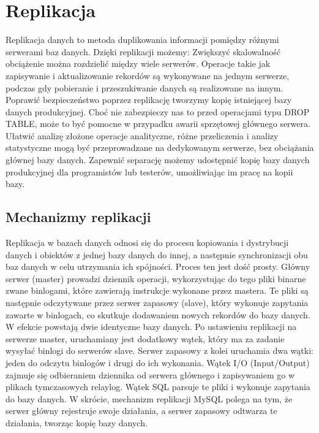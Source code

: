 \documentclass[letterpaper,10pt,polish]{sphinxmanual}
\begin{document}
\sphinxstepscope


\chapter{Replikacja}
\label{\detokenize{rozdzialy/rozdzial5:replikacja}}\label{\detokenize{rozdzialy/rozdzial5::doc}}
\sphinxAtStartPar
Replikacja danych to metoda duplikowania informacji pomiędzy różnymi serwerami baz danych.
Dzięki replikacji możemy:
\sphinxhyphen{} Zwiększyć skalowalność \textendash{} obciążenie można rozdzielić między wiele serwerów. Operacje takie jak zapisywanie i aktualizowanie rekordów są wykonywane na jednym serwerze, podczas gdy pobieranie i przeszukiwanie danych są realizowane na innym.
\sphinxhyphen{} Poprawić bezpieczeństwo \textendash{} poprzez replikację tworzymy kopię istniejącej bazy danych produkcyjnej. Choć nie zabezpieczy nas to przed operacjami typu DROP TABLE, może to być pomocne w przypadku awarii sprzętowej głównego serwera.
\sphinxhyphen{} Ułatwić analizę \textendash{} złożone operacje analityczne, różne przeliczenia i analizy statystyczne mogą być przeprowadzane na dedykowanym serwerze, bez obciążania głównej bazy danych.
\sphinxhyphen{} Zapewnić separację \textendash{} możemy udostępnić kopię bazy danych produkcyjnej dla programistów lub testerów, umożliwiając im pracę na kopii bazy.


\section{Mechanizmy replikacji}
\label{\detokenize{rozdzialy/rozdzial5:mechanizmy-replikacji}}
\sphinxAtStartPar
Replikacja w bazach danych odnosi się do procesu kopiowania i dystrybucji danych i obiektów z jednej bazy danych do innej, a następnie synchronizacji obu baz danych w celu utrzymania ich spójności.
Proces ten jest dość prosty. Główny serwer (master) prowadzi dziennik operacji, wykorzystując do tego pliki binarne zwane bin\sphinxhyphen{}logami, które zawierają instrukcje wykonane przez mastera. Te pliki są następnie odczytywane przez serwer zapasowy (slave), który wykonuje zapytania zawarte w bin\sphinxhyphen{}logach, co skutkuje dodawaniem nowych rekordów do bazy danych. W efekcie powstają dwie identyczne bazy danych. Po ustawieniu replikacji na serwerze master, uruchamiany jest dodatkowy wątek, który ma za zadanie wysyłać bin\sphinxhyphen{}logi do serwerów slave. Serwer zapasowy z kolei uruchamia dwa wątki: jeden do odczytu bin\sphinxhyphen{}logów i drugi do ich wykonania.
\sphinxhyphen{} Wątek I/O (Input/Output) \sphinxhyphen{} zajmuje się odbieraniem dziennika od serwera głównego i zapisywaniem go w plikach tymczasowych relay\sphinxhyphen{}log.
\sphinxhyphen{} Wątek SQL \sphinxhyphen{} parsuje te pliki i wykonuje zapytania do bazy danych.
W skrócie, mechanizm replikacji MySQL polega na tym, że serwer główny rejestruje swoje działania, a serwer zapasowy odtwarza te działania, tworząc kopię bazy danych.
\end{document}
